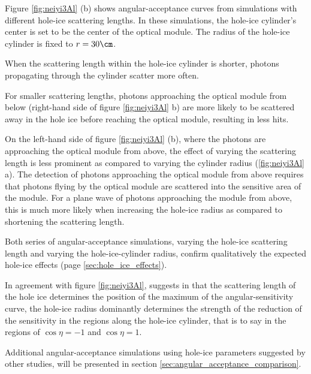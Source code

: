 
Figure \ref{fig:neiyi3Al} (b) shows angular-acceptance curves from simulations with different hole-ice scattering lengths. In these simulations, the hole-ice cylinder's center is set to be the center of the optical module. The radius of the hole-ice cylinder is fixed to $r = 30\cm$.

When the scattering length within the hole-ice cylinder is shorter, photons propagating through the cylinder scatter more often.

For smaller scattering lengths, photons approaching the optical module from below (right-hand side of figure \ref{fig:neiyi3Al} b) are more likely to be scattered away in the hole ice before reaching the optical module, resulting in less hits.

On the left-hand side of figure \ref{fig:neiyi3Al} (b), where the photons are approaching the optical module from above, the effect of varying the scattering length is less prominent as compared to varying the cylinder radius (\ref{fig:neiyi3Al} a). The detection of photons approaching the optical module from above requires that photons flying by the optical module are scattered into the sensitive area of the module. For a plane wave of photons approaching the module from above, this is much more likely when increasing the hole-ice radius as compared to shortening the scattering length.

Both series of angular-acceptance simulations, varying the hole-ice scattering length and varying the hole-ice-cylinder radius, confirm qualitatively the expected hole-ice effects (page \ref{sec:hole_ice_effects}).

In agreement with figure \ref{fig:neiyi3Al}, \rongen suggests in \cite{pocam}
that the scattering length of the hole ice determines the position of the maximum of the angular-sensitivity curve, the hole-ice radius dominantly determines the strength of the reduction of the sensitivity in the regions along the hole-ice cylinder, that is to say in the regions of $\cos \eta = -1$ and $\cos \eta = 1$.

Additional angular-acceptance simulations using hole-ice parameters suggested by other studies, will be presented in section \ref{sec:angular_acceptance_comparison}.
